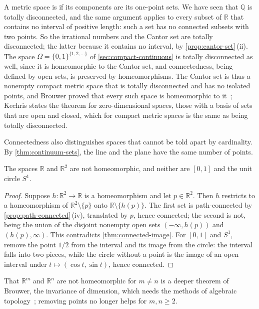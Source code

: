 A metric space is  if its components are its one-point sets. We have seen that $\mathbb Q$ is totally disconnected, and the same argument applies to every subset of $\mathbb R$ that contains no interval of positive length: such a set has no connected subsets with two points. So the irrational numbers and the Cantor set are totally disconnected; the latter because it contains no interval, by \cref{prop:cantor-set}\,(ii). The space $\Omega=\{0,1\}^{\{1,2,\ldots\}}$ of \cref{sec:compact-continuous} is totally disconnected as well, since it is homeomorphic to the Cantor set, and connectedness, being defined by open sets, is preserved by homeomorphisms. The Cantor set is thus a nonempty compact metric space that is totally disconnected and has no isolated points, and Brouwer proved that every such space is homeomorphic to it~\cite[Thm.~7.4]{kechris1995}; Kechris states the theorem for zero-dimensional spaces, those with a basis of sets that are open and closed, which for compact metric spaces is the same as being totally disconnected.

Connectedness also distinguishes spaces that cannot be told apart by cardinality. By \cref{thm:continuum-sets}, the line and the plane have the same number of points.

\begin{proposition}
\label{prop:line-plane}
The spaces $\mathbb R$ and $\mathbb R^2$ are not homeomorphic, and neither are $[0,1]$ and the unit circle $S^1$.
\end{proposition}

\begin{proof}
Suppose $h\colon\mathbb R^2\to\mathbb R$ is a homeomorphism and let $p\in\mathbb R^2$. Then $h$ restricts to a homeomorphism of $\mathbb R^2\setminus\{p\}$ onto $\mathbb R\setminus\{h(p)\}$. The first set is path-connected by \cref{prop:path-connected}\,(iv), translated by $p$, hence connected; the second is not, being the union of the disjoint nonempty open sets $(-\infty,h(p))$ and $(h(p),\infty)$. This contradicts \cref{thm:connected-image}. For $[0,1]$ and $S^1$, remove the point $1/2$ from the interval and its image from the circle: the interval falls into two pieces, while the circle without a point is the image of an open interval under $t\mapsto(\cos t,\sin t)$, hence connected.
\end{proof}

That $\mathbb R^m$ and $\mathbb R^n$ are not homeomorphic for $m\ne n$ is a deeper theorem of Brouwer, the invariance of dimension, which needs the methods of algebraic topology~\cite[Sect.~2.B]{hatcher2002}; removing points no longer helps for $m,n\ge2$.


